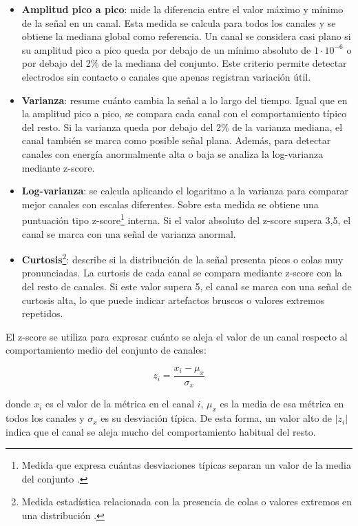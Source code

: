 \begin{itemize}
    \item \textbf{Amplitud pico a pico}: mide la diferencia entre el valor máximo y mínimo de la señal en un canal. Esta medida se calcula para todos los canales y se obtiene la mediana global como referencia. Un canal se considera casi plano si su amplitud pico a pico queda por debajo de un mínimo absoluto de \(1 \cdot 10^{-6}\) o por debajo del 2\% de la mediana del conjunto. Este criterio permite detectar electrodos sin contacto o canales que apenas registran variación útil.
    \item \textbf{Varianza}: resume cuánto cambia la señal a lo largo del tiempo. Igual que en la amplitud pico a pico, se compara cada canal con el comportamiento típico del resto. Si la varianza queda por debajo del 2\% de la varianza mediana, el canal también se marca como posible señal plana. Además, para detectar canales con energía anormalmente alta o baja se analiza la log-varianza mediante z-score.
    \item \textbf{Log-varianza}: se calcula aplicando el logaritmo a la varianza para comparar mejor canales con escalas diferentes. Sobre esta medida se obtiene una puntuación tipo z-score\footnote{Medida que expresa cuántas desviaciones típicas separan un valor de la media del conjunto \cite{wikipediaStandardScore}.} interna. Si el valor absoluto del z-score supera 3,5, el canal se marca con una señal de varianza anormal.
    \item \textbf{Curtosis}\footnote{Medida estadística relacionada con la presencia de colas o valores extremos en una distribución \cite{wikipediaKurtosis}.}: describe si la distribución de la señal presenta picos o colas muy pronunciadas. La curtosis de cada canal se compara mediante z-score con la del resto de canales. Si este valor supera 5, el canal se marca con una señal de curtosis alta, lo que puede indicar artefactos bruscos o valores extremos repetidos.
\end{itemize}

El z-score se utiliza para expresar cuánto se aleja el valor de un canal respecto al comportamiento medio del conjunto de canales:

\begin{myequation}[H]
\[
z_i = \frac{x_i - \mu_x}{\sigma_x}
\]
\caption{Cálculo del z-score para una métrica de canal.}
\label{eq:zscore_canales}
\end{myequation}

donde \(x_i\) es el valor de la métrica en el canal \(i\), \(\mu_x\) es la media de esa métrica en todos los canales y \(\sigma_x\) es su desviación típica. De esta forma, un valor alto de \(|z_i|\) indica que el canal se aleja mucho del comportamiento habitual del resto.


